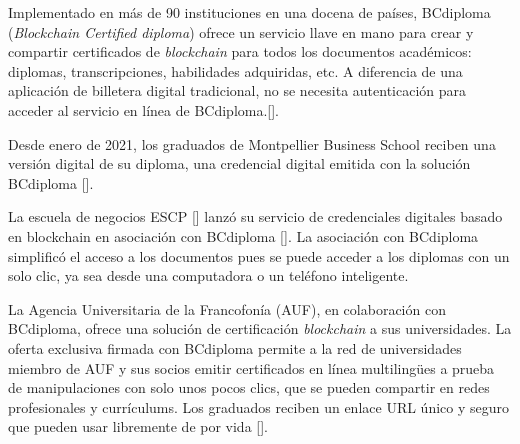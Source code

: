 
Implementado en más de 90 instituciones en una docena de países, BCdiploma (\textit{Blockchain Certified diploma}) ofrece un servicio llave en mano para crear y compartir certificados de \textit{blockchain} para todos los documentos académicos: diplomas, transcripciones, habilidades adquiridas, etc. A diferencia de una aplicación de billetera digital tradicional, no se necesita autenticación para acceder al servicio en línea de BCdiploma.[\cite{75}].


Desde enero de 2021, los graduados de Montpellier Business School reciben una versión digital de su diploma, una credencial digital emitida con la solución BCdiploma [\cite{75, 78}].

La escuela de negocios ESCP [\cite{74}] lanzó su servicio de credenciales digitales basado en blockchain en asociación con BCdiploma [\cite{75}]. La asociación con BCdiploma simplificó el acceso a los documentos pues se puede acceder a los diplomas con un solo clic, ya sea desde una computadora o un teléfono inteligente.

La Agencia Universitaria de la Francofonía (AUF), en colaboración con BCdiploma, ofrece una solución de certificación \textit{blockchain} a sus universidades. La oferta exclusiva firmada con BCdiploma permite a la red de universidades miembro de AUF y sus socios emitir certificados en línea multilingües a prueba de manipulaciones con solo unos pocos clics, que se pueden compartir en redes profesionales y currículums. Los graduados reciben un enlace URL único y seguro que pueden usar libremente de por vida [\cite{77}].


